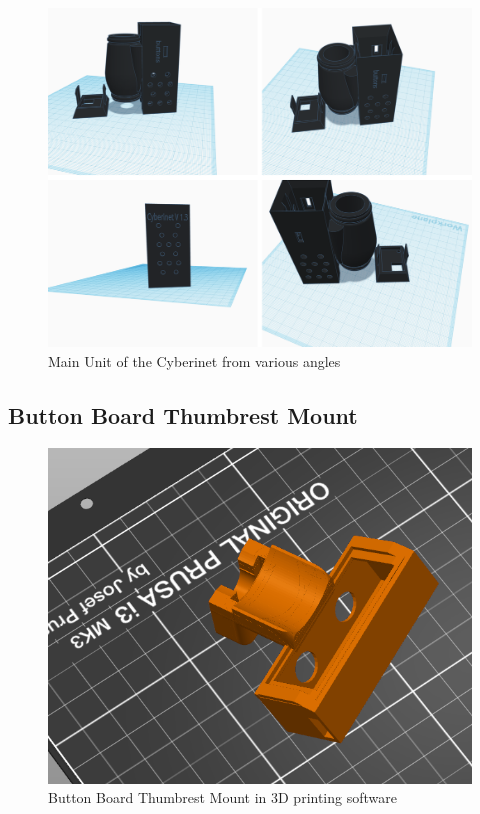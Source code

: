 \begin{figure}
    \centering
    \includegraphics[scale=0.4]{diagrams/3D Models/Cyberinet main case 3d.png}
    \caption{Main Unit of the Cyberinet from various angles}
    \label{fig:main3D}
\end{figure}



\subsection{Button Board Thumbrest Mount}

\begin{figure}
    \centering
    \includegraphics[scale=0.8]{diagrams/3D Models/thumbrestPic.png}
    \caption{Button Board Thumbrest Mount in 3D printing software}
    \label{fig:thumbrest}
\end{figure}



